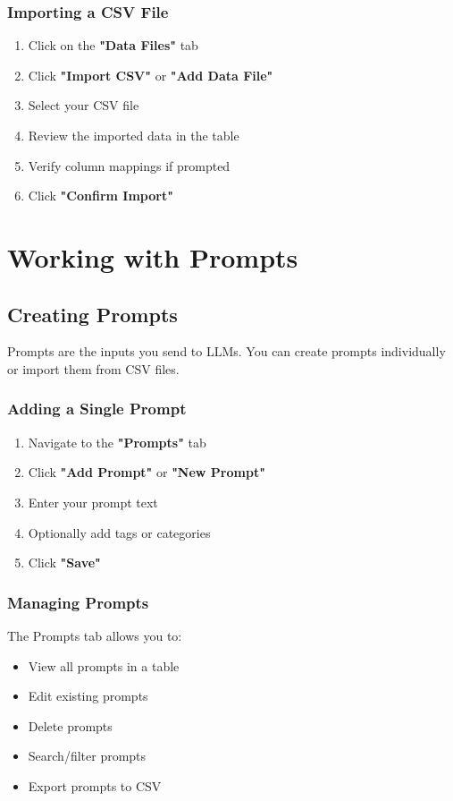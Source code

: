 \documentclass[11pt,a4paper]{article}
\begin{document}
\subsubsection{Importing a CSV File}
\begin{enumerate}
    \item Click on the \textbf{"Data Files"} tab
    \item Click \textbf{"Import CSV"} or \textbf{"Add Data File"}
    \item Select your CSV file
    \item Review the imported data in the table
    \item Verify column mappings if prompted
    \item Click \textbf{"Confirm Import"}
\end{enumerate}

\section{Working with Prompts}
\label{sec:prompts}

\subsection{Creating Prompts}
Prompts are the inputs you send to LLMs. You can create prompts individually or import them from CSV files.

\subsubsection{Adding a Single Prompt}
\begin{enumerate}
    \item Navigate to the \textbf{"Prompts"} tab
    \item Click \textbf{"Add Prompt"} or \textbf{"New Prompt"}
    \item Enter your prompt text
    \item Optionally add tags or categories
    \item Click \textbf{"Save"}
\end{enumerate}

\subsubsection{Managing Prompts}
The Prompts tab allows you to:
\begin{itemize}
    \item View all prompts in a table
    \item Edit existing prompts
    \item Delete prompts
    \item Search/filter prompts
    \item Export prompts to CSV
\end{itemize}
\end{document}
